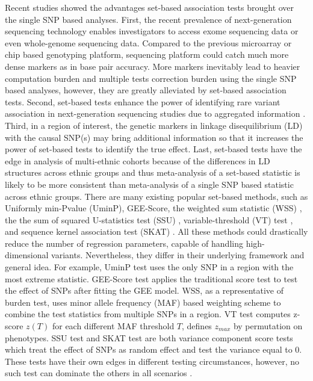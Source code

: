 \documentclass[12pt]{article}
\begin{document}
Recent studies showed the advantages set-based association tests brought over the single SNP based analyses. First, the recent prevalence of next-generation sequencing technology enables investigators to access exome sequencing data or even whole-genome sequencing data. Compared to the previous microarray or chip based genotyping platform, sequencing platform could catch much more dense markers as in base pair accuracy. More markers inevitably lead to heavier computation burden and multiple tests correction burden using the single SNP based analyses, however, they are greatly alleviated by set-based association tests. Second, set-based tests enhance the power of identifying rare variant association in next-generation sequencing studies due to aggregated information \cite{Morris2010}. Third, in a region of interest, the genetic markers in linkage disequilibrium (LD) with the causal SNP(s) may bring additional information so that it increases the power of set-based tests to identify the true effect. Last, set-based tests have the edge in analysis of multi-ethnic cohorts because of the differences in LD structures across ethnic groups and thus meta-analysis of a set-based statistic is likely to be more consistent than meta-analysis of a single SNP based statistic across ethnic groups. There are many existing popular set-based methods, such as Uniformly min-Pvalue (UminP), GEE-Score, the weighted sum statistic (WSS) \cite{Madsen2009}, the the sum of squared U-statistics test (SSU) \cite{Pan2009}, variable-threshold (VT) test \cite{Price2010}, and sequence kernel association test (SKAT) \cite{Wu2011}. All these methods could drastically reduce the number of regression parameters, capable of handling high-dimensional variants. Nevertheless, they differ in their underlying framework and general idea. For example, UminP test uses the only SNP in a region with the most extreme statistic. GEE-Score test applies the traditional score test to test the effect of SNPs after fitting the GEE model. WSS, as a representative of burden test, uses minor allele frequency (MAF) based weighting scheme to combine the test statistics from multiple SNPs in a region. VT test computes z-score $z(T)$ for each different MAF threshold $T$, defines $z_{max}$ by permutation on phenotypes. SSU test and SKAT test are both variance component score tests which treat the effect of SNPs as random effect and test the variance equal to 0. These tests have their own edges in different testing circumstances, however, no such test can dominate the others in all scenarios \cite{Han2010,Sun2013,pan2014powerful,Derkach2013}.
\end{document}
